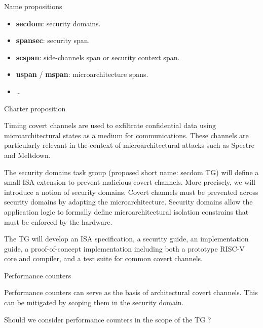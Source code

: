 \documentclass[11pt]{beamer}
\begin{document}


\begin{frame}{Name propositions}
\begin{itemize}
    \item \textbf{secdom}: security domains.
    \item \textbf{spansec}: security span.
    \item \textbf{scspan}: side-channels span or security context span.
    \item \textbf{uspan} / \textbf{mspan}: microarchitecture spans.
    \item \ldots
\end{itemize}
\end{frame}

\begin{frame}{Charter proposition}
    \begin{block}{}
        \begin{small}
Timing covert channels are used to exfiltrate confidential data using microarchitectural states as a medium for communications.
These channels are particularly relevant in the context of microarchitectural attacks such as Spectre and Meltdown.


The security domains task group (proposed short name: secdom TG) will define a small ISA extension to prevent malicious covert channels.
More precisely, we will introduce a notion of security domains. Covert channels must be prevented across security domains by adapting the microarchitecture. Security domains allow the application logic to formally define microarchitectural isolation constrains that must be enforced by the hardware.


The TG will develop an ISA specification, a security guide, an implementation guide, a proof-of-concept implementation including both a prototype RISC-V core and compiler, and a test suite for common covert channels.
        \end{small}
    \end{block}
\end{frame}

\begin{frame}{Performance counters}

    \begin{block}{}
        Performance counters can serve as the basis of architectural covert channels.
        This can be mitigated by scoping them in the security domain.
    \end{block}

    \begin{block}{}
        Should we consider performance counters in the scope of the TG ?
    \end{block}
\end{frame}
\end{document}
